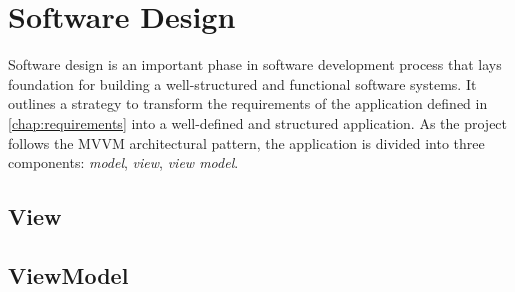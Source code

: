 \section{Software Design}
Software design is an important phase in software development process that lays foundation for building a well-structured and functional software systems. 
It outlines a strategy to transform the requirements of the application defined in \autoref{chap:requirements} into a well-defined and structured application.
As the project follows the MVVM architectural pattern, the application is divided into three components: \emph{model}, \emph{view}, \emph{view model}. 



\subsection{View}
\subsection{ViewModel}